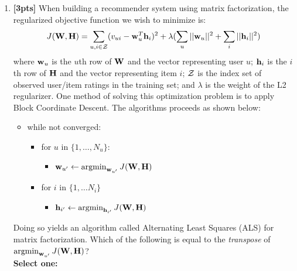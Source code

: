 \documentclass[11pt,addpoints,answers]{exam}
\renewcommand{\circle}{\tikz\draw[black] (0,0) circle (1ex);}
\newcommand{\argmin}{\mathop{\mathrm{argmin}}}
\begin{document}
\begin{enumerate}
    
    \clearpage
    
     \item \textbf{[3pts]} When building a recommender system using matrix factorization, the regularized objective function we wish to minimize is:
     $$J(\mathbf{W}, \mathbf{H}) =  \sum_{u,i \in \mathcal{Z}}(v_{ui}-\mathbf{w}_u^T \mathbf{h}_i)^2+\lambda(\sum_u ||\mathbf{w}_u||^2+\sum_i ||\mathbf{h}_i||^2)$$
     where $\mathbf{w}_u$ is the $u$th row of $\mathbf{W}$ and the vector representing user $u$; $\mathbf{h}_i$ is the $i$th row of $\mathbf{H}$ and the vector representing item $i$; $\mathcal{Z}$ is the index set of observed user/item ratings in the training set; and $\lambda$ is the weight of the L2 regularizer. One method of solving this optimization problem is to apply Block Coordinate Descent. The algorithms proceeds as shown below:
     
     \begin{itemize}
         \item while not converged:
         \begin{itemize}
            \item for $u$ in $\{1, \ldots, N_u\}$:
            \begin{itemize}
                \item $\wv_{u'} \leftarrow \argmin_{\wv_{u'}} J(\Wv, \Hv)$
            \end{itemize}
            \item for $i$ in $\{1, \ldots N_i\}$
             \begin{itemize}
                \item $\hv_{i'} \leftarrow \argmin_{\hv_{i'}} J(\Wv, \Hv)$
            \end{itemize}
         \end{itemize}
     \end{itemize}
     
     Doing so yields an algorithm called Alternating Least Squares (ALS) for matrix factorization. Which of the following is equal to the \emph{transpose} of $\argmin_{\wv_{u'}} J(\Wv, \Hv)$?\\
     \textbf{Select one:}

    
    
\end{enumerate}
    \clearpage
\end{document}
